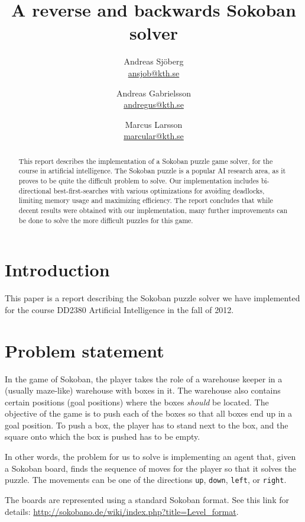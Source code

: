 \documentclass[a4paper,11pt]{article}
\title{A reverse and backwards Sokoban solver \\ }
\author{Andreas Sjöberg \\ \url{ansjob@kth.se} 
		\and Andreas Gabrielsson \\ \url{andregus@kth.se} 
		\and Marcus Larsson \\ \url{marcular@kth.se}
	}
\begin{document}
\thispagestyle{plain}
\maketitle

\begin{abstract}
This report describes the implementation of a Sokoban puzzle game solver,
for the course in artificial intelligence.
The Sokoban puzzle is a popular AI research area, as it proves to be quite
the difficult problem to solve.
Our implementation includes bi-directional best-first-searches with various
optimizations for avoiding deadlocks, limiting memory usage and maximizing
efficiency.
The report concludes that while decent results were obtained with our implementation,
many further improvements can be done to solve the more difficult puzzles for this game.
\end{abstract}

\clearpage

\tableofcontents

\clearpage

\section{Introduction}
This paper is a report describing the Sokoban puzzle solver we have implemented for the course
DD2380 Artificial Intelligence in the fall of 2012.

\section{Problem statement}

In the game of Sokoban, the player takes the role of a warehouse keeper in a
(usually maze-like) warehouse with boxes in it.
The warehouse also contains certain positions (goal positions) where the boxes \emph{should} be located.
The objective of the game is to push each of the boxes so that all boxes end up
in a goal position.
To push a box, the player has to stand next to the box,
and the square onto which the box is pushed has to be empty.

In other words, the problem for us to solve is implementing an agent that,
given a Sokoban board, finds the sequence of moves for the player so that
it solves the puzzle.
The movements can be one of the directions \verb!up!, \verb!down!, \verb!left!, or \verb!right!.

The boards are represented using a standard Sokoban format. See this link for details:
\url{http://sokobano.de/wiki/index.php?title=Level_format}.
\end{document}
